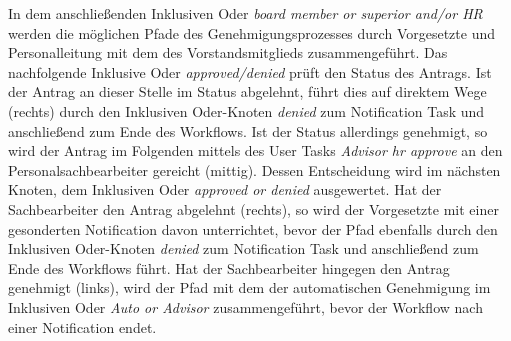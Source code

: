 In dem anschließenden Inklusiven Oder \textit{board member or superior and/or HR} werden die möglichen Pfade des Genehmigungsprozesses durch Vorgesetzte und Personalleitung mit dem des Vorstandsmitglieds zusammengeführt. Das nachfolgende Inklusive Oder \textit{approved/denied} prüft den Status des Antrags. Ist der Antrag an dieser Stelle im Status abgelehnt, führt dies auf direktem Wege (rechts) durch den Inklusiven Oder-Knoten \textit{denied} zum Notification Task und anschließend zum Ende des Workflows. Ist der Status allerdings genehmigt, so wird der Antrag im Folgenden mittels des User Tasks \textit{Advisor hr approve} an den Personalsachbearbeiter gereicht (mittig). Dessen Entscheidung wird im nächsten Knoten, dem Inklusiven Oder \textit{approved or denied} ausgewertet. Hat der Sachbearbeiter den Antrag abgelehnt (rechts), so wird der Vorgesetzte mit einer gesonderten Notification davon unterrichtet, bevor der Pfad ebenfalls durch den Inklusiven Oder-Knoten \textit{denied} zum Notification Task und anschließend zum Ende des Workflows führt. Hat der Sachbearbeiter hingegen den Antrag genehmigt (links), wird der Pfad mit dem der automatischen Genehmigung im Inklusiven Oder \textit{Auto or Advisor} zusammengeführt, bevor der Workflow nach einer Notification endet. 




